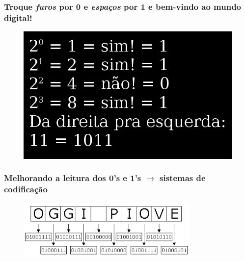 \documentclass[10pt]{beamer}
\begin{document}
\begin{frame}[fragile]

\frametitle{Troque \textit{furos} por \textbf{0} e \textit{espaços} por \textbf{1} e bem-vindo ao mundo digital!}

\begin{figure}[!ht]
\centering
\includegraphics[height =.65\textheight,width=.8\textwidth]
{figuras/computador_internamente.jpg}
\end{figure}

\end{frame}

\begin{frame}[fragile]

\frametitle{Melhorando a leitura dos \textbf{0's} e \textbf{1's} $\rightarrow$ sistemas de codificação}

\begin{figure}[!ht]
\centering
\includegraphics[height =.4\textheight,width=.7\textwidth]
{figuras/bin_codifica_ASCII.png}
\end{figure}

\end{frame}
\end{document}
